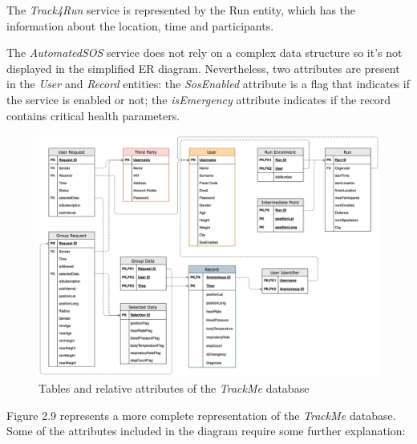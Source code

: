 The \textit{Track4Run} service is represented by the Run entity, which has the information about the location, time and participants.

The \textit{AutomatedSOS} service does not rely on a complex data structure so it’s not displayed in the simplified ER diagram. Nevertheless, two attributes are present in the \textit{User} and \textit{Record} entities: the \textit{SosEnabled} attribute is a flag that indicates if the service is enabled or not; the \textit{isEmergency} attribute indicates if the record contains critical health parameters.

\begin{figure}[H]

\includegraphics[scale=0.17,keepaspectratio]{./Pictures/ER-tables.png}
\centering
\caption{Tables and relative attributes of the \textit{TrackMe} database}

\end{figure}

Figure 2.9 represents a more complete representation of the \textit{TrackMe} database. Some of the attributes included in the diagram require some further explanation:

